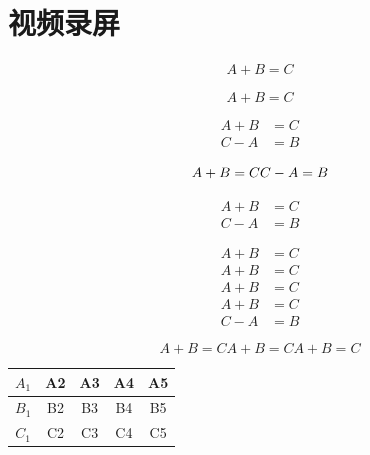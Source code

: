 \chapter{视频录屏}
\begin{align*}
    A + B = C
\end{align*}

\begin{equation*}
    A + B = C
\end{equation*}

\begin{align*}
    A + B & = C \\
    C - A & = B
\end{align*}

\begin{equation*}
    A + B = C \\
    C - A = B
\end{equation*}

\begin{align}
    A + B & = C \\
    C - A & = B
\end{align}

\begin{equation}
    \begin{aligned}
    A + B & = C \\
    A + B & = C \\
    A + B & = C \\
    A + B & = C \\
    C - A & = B
    \end{aligned}
\end{equation}

\begin{subequations}
\begin{equation}
    A + B = C
\end{equation}
\begin{equation*}
    A + B = C
\end{equation*}
\begin{equation}
    A + B = C
\end{equation}
\end{subequations}

\begin{center}
\begin{tabular}{|c|c|c|c|c|}
\hline
    $A_1$ & A2 & A3 & A4 &A5 \\
    \hline
    $B_1$ & B2 &B3 & B4 &B5 \\
    \hline
    $C_1$ & C2 & C3 & C4 &C5 \\
    \hline
\end{tabular}    
\end{center}


